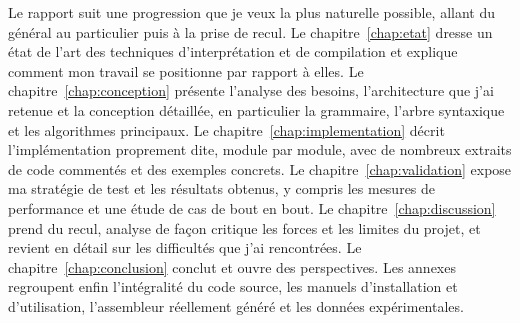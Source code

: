 Le rapport suit une progression que je veux la plus naturelle possible, allant du
général au particulier puis à la prise de recul. Le chapitre~\ref{chap:etat} dresse
un état de l'art des techniques d'interprétation et de compilation et explique
comment mon travail se positionne par rapport à elles. Le
chapitre~\ref{chap:conception} présente l'analyse des besoins, l'architecture que
j'ai retenue et la conception détaillée, en particulier la grammaire, l'arbre
syntaxique et les algorithmes principaux. Le chapitre~\ref{chap:implementation}
décrit l'implémentation proprement dite, module par module, avec de nombreux
extraits de code commentés et des exemples concrets. Le
chapitre~\ref{chap:validation} expose ma stratégie de test et les résultats
obtenus, y compris les mesures de performance et une étude de cas de bout en bout.
Le chapitre~\ref{chap:discussion} prend du recul, analyse de façon critique les
forces et les limites du projet, et revient en détail sur les difficultés que j'ai
rencontrées. Le chapitre~\ref{chap:conclusion} conclut et ouvre des perspectives.
Les annexes regroupent enfin l'intégralité du code source, les manuels
d'installation et d'utilisation, l'assembleur réellement généré et les données
expérimentales.
